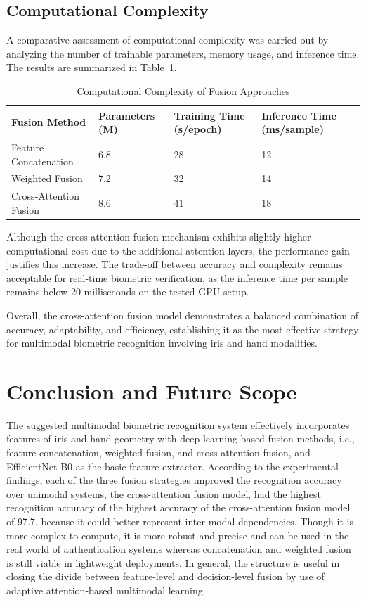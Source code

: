 \documentclass[12pt,a4paper]{report}
\begin{document}
\subsection{Computational Complexity}

A comparative assessment of computational complexity was carried out by analyzing the number of trainable parameters, memory usage, and inference time. The results are summarized in Table~\ref{tab:complexity}.

\begin{table}[h]
\centering
\caption{Computational Complexity of Fusion Approaches}
\label{tab:complexity}
\begin{tabular}{|p{3.0cm}|p{2.5cm}|p{2.5cm}|p{2.5cm}|}
\hline
\textbf{Fusion Method} & \textbf{Parameters (M)} & \textbf{Training Time (s/epoch)} & \textbf{Inference Time (ms/sample)} \\
\hline
Feature Concatenation & 6.8 & 28 & 12 \\
\hline
Weighted Fusion & 7.2 & 32 & 14 \\
\hline
Cross-Attention Fusion & 8.6 & 41 & 18 \\
\hline
\end{tabular}
\end{table}

Although the cross-attention fusion mechanism exhibits slightly higher computational cost due to the additional attention layers, the performance gain justifies this increase. The trade-off between accuracy and complexity remains acceptable for real-time biometric verification, as the inference time per sample remains below 20 milliseconds on the tested GPU setup.

Overall, the cross-attention fusion model demonstrates a balanced combination of accuracy, adaptability, and efficiency, establishing it as the most effective strategy for multimodal biometric recognition involving iris and hand modalities.

\section{Conclusion and Future Scope}
The suggested multimodal biometric recognition system effectively incorporates features of iris and hand geometry with deep learning-based fusion methods, i.e., feature concatenation, weighted fusion, and cross-attention fusion, and EfficientNet-B0 as the basic feature extractor. According to the experimental findings, each of the three fusion strategies improved the recognition accuracy over unimodal systems, the cross-attention fusion model, had the highest recognition accuracy of the highest accuracy of the cross-attention fusion model of 97.7, because it could better represent inter-modal dependencies. Though it is more complex to compute, it is more robust and precise and can be used in the real world of authentication systems whereas concatenation and weighted fusion is still viable in lightweight deployments. In general, the structure is useful in closing the divide between feature-level and decision-level fusion by use of adaptive attention-based multimodal learning.
\end{document}
